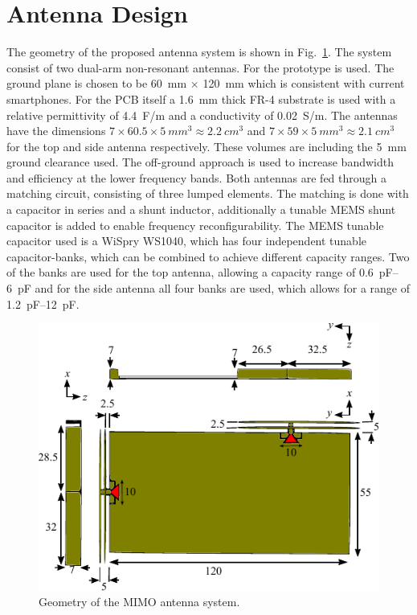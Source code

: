 \section{Antenna Design}
\label{sec:antennadesign}
The geometry of the proposed antenna system is shown in Fig.~\ref{fig:antdesign}. The system consist of two dual-arm non-resonant antennas. For the prototype  is used. The ground plane is chosen to be \SI{60}{mm} $\times$ \SI{120}{mm} which is consistent with current smartphones. For the PCB itself a \SI{1.6}{mm} thick FR-4 substrate is used with a relative permittivity of \SI{4.4}{F/m}  and a conductivity of \SI{0.02}{S/m}. The antennas have the dimensions $7 \times 60.5 \times 5\:  \si{mm^3} \approx 2.2\:  \si{cm^3} $ 
 and $7 \times 59 \times 5\:  \si{mm^3} \approx 2.1\:  \si{cm^3}$  for the top and side antenna respectively. These volumes are including the \SI{5}{mm} ground clearance used. The off-ground approach is used to increase bandwidth and efficiency at the lower frequency bands. Both antennas are fed through a matching circuit, consisting of three lumped elements. The matching is done with a capacitor in series and a shunt inductor, additionally a tunable MEMS  shunt capacitor is added to enable frequency reconfigurability. The MEMS tunable capacitor used is a WiSpry WS1040, which has four independent tunable capacitor-banks, which can be combined to achieve different capacity ranges. Two of the banks are used for the top antenna, allowing a capacity range of \SIrange{0.6}{6}{pF} and for the side antenna all four banks are used, which allows for a range of \SIrange{1.2}{12}{pF}.

\begin{figure}[t]
  \begin{center}
    \includegraphics{img/3d_drawing}
  \end{center}
  \caption{Geometry of the MIMO antenna system.}
  \label{fig:antdesign}
\end{figure}

